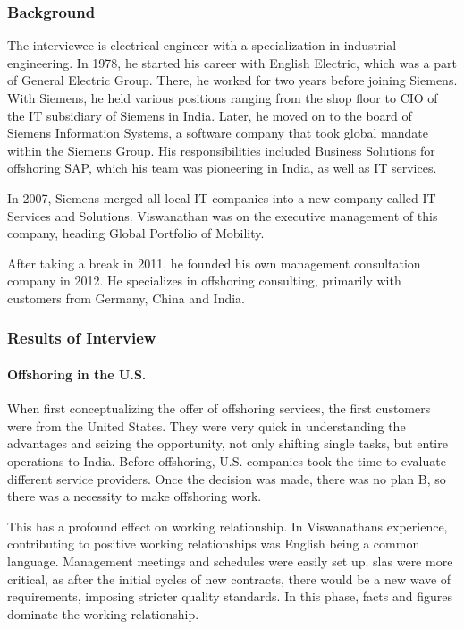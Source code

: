 \subsubsection{Background}
The interviewee is electrical engineer with a specialization in industrial engineering. In 1978, he started his career with English Electric, which was a part of General Electric Group. There, he worked for two years before joining Siemens. With Siemens, he held various positions ranging from the shop floor to CIO of the IT subsidiary of Siemens in India. Later, he moved on to the board of Siemens Information Systems, a software company that took global mandate within the Siemens Group. His responsibilities included Business Solutions for offshoring SAP, which his team was pioneering in India, as well as IT services.

In 2007, Siemens merged all local IT companies into a new company called IT Services and Solutions. Viswanathan was on the executive management of this company, heading Global Portfolio of Mobility.

After taking a break in 2011, he founded his own management consultation company in 2012. He specializes in offshoring consulting, primarily with customers from Germany, China and India.

\subsubsection{Results of Interview}
\paragraph{Offshoring in the U.S.}When first conceptualizing the offer of offshoring services, the first customers were from the United States. They were very quick in understanding the advantages and seizing the opportunity, not only shifting single tasks, but entire operations to India. Before offshoring, U.S. companies took the time to evaluate different service providers. Once the decision was made, there was no plan B, so there was a necessity to make offshoring work.

This has a profound effect on working relationship. In Viswanathans experience, contributing to positive working relationships was English being a common language. Management meetings and schedules were easily set up. \Glspl{sla} were more critical, as after the initial cycles of new contracts, there would be a new wave of requirements, imposing stricter quality standards. In this phase, facts and figures dominate the working relationship.


